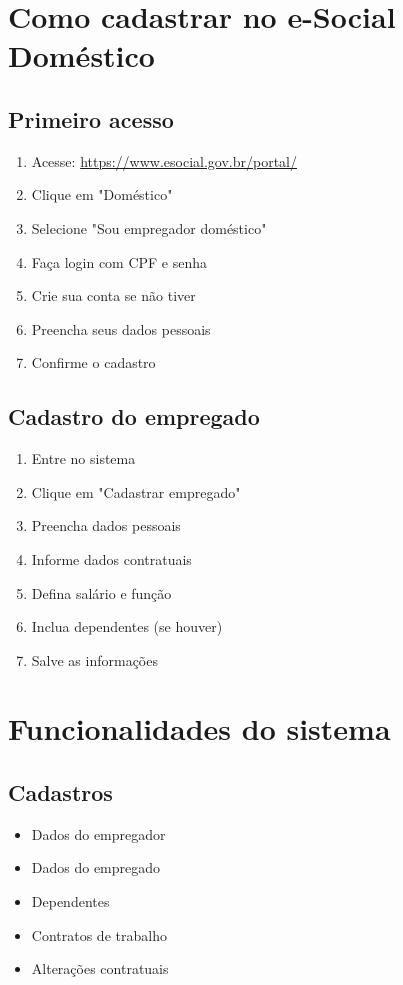 \documentclass[12pt,a4paper]{article}
\begin{document}
\section{Como cadastrar no e-Social Doméstico}

\subsection{Primeiro acesso}
\begin{enumerate}
    \item Acesse: \url{https://www.esocial.gov.br/portal/}
    \item Clique em "Doméstico"
    \item Selecione "Sou empregador doméstico"
    \item Faça login com CPF e senha
    \item Crie sua conta se não tiver
    \item Preencha seus dados pessoais
    \item Confirme o cadastro
\end{enumerate}

\subsection{Cadastro do empregado}
\begin{enumerate}
    \item Entre no sistema
    \item Clique em "Cadastrar empregado"
    \item Preencha dados pessoais
    \item Informe dados contratuais
    \item Defina salário e função
    \item Inclua dependentes (se houver)
    \item Salve as informações
\end{enumerate}

\section{Funcionalidades do sistema}

\subsection{Cadastros}
\begin{itemize}
    \item Dados do empregador
    \item Dados do empregado
    \item Dependentes
    \item Contratos de trabalho
    \item Alterações contratuais
\end{itemize}
\end{document}
